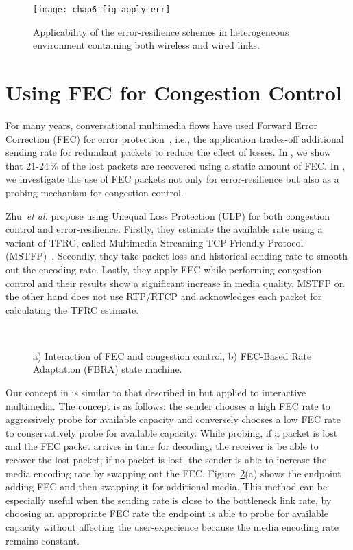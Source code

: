 \begin{figure}
\centerline {
\texttt{[image: chap6-fig-apply-err]}
}
\caption{Applicability of the error-resilience schemes in heterogeneous
environment containing both wireless and wired links.}
\label{fig:apply_err}
\end{figure}


\section{Using FEC for Congestion Control}

For many years, conversational multimedia flows have used Forward Error
Correction (FEC) for error protection~\cite{855913, 664283}, i.e., the
application trades-off additional sending rate for redundant packets to reduce
the effect of losses. In , we show that 21-24\,\% of the lost
packets are recovered using a static amount of FEC. In , we
investigate the use of FEC packets not only for error-resilience but also as a
probing mechanism for congestion control.

Zhu~\textit{et al.}\cite{Zhu:2001tu,springerlink:1022865704606} propose using
Unequal Loss Protection (ULP) for both congestion control and error-resilience. 
Firstly, they estimate the available rate using a variant of TFRC,
called Multimedia Streaming TCP-Friendly Protocol (MSTFP)~\cite{871542}.
Secondly, they take packet loss and historical sending rate to smooth out the
encoding rate. Lastly, they apply FEC while performing congestion control and
their results show a significant increase in media quality. MSTFP on the other
hand does not use RTP/RTCP and acknowledges each packet for calculating the
TFRC estimate.


\begin{figure}
  \centering
   \\
\caption{a) Interaction of FEC and congestion control, b) FEC-Based Rate
Adaptation (FBRA) state machine.}
\label{fig:fecrc-intro}
\end{figure}

Our concept in  is similar to that described in
\cite{Zhu:2001tu} but applied to interactive multimedia. The concept is as
follows: the sender chooses a high FEC rate to aggressively probe for
available capacity and conversely chooses a low FEC rate to conservatively
probe for available capacity. While probing, if a packet is lost and the FEC
packet arrives in time for decoding, the receiver is be able to recover the
lost packet; if no packet is lost, the sender is able to increase the media
encoding rate by swapping out the FEC. Figure~\ref{fig:fecrc-intro}(a) shows
the endpoint adding FEC and then swapping it for additional media. This method
can be especially useful when the sending rate is close to the bottleneck link
rate, by choosing an appropriate FEC rate the endpoint is able to probe for
available capacity without affecting the user-experience because the media
encoding rate remains constant.

